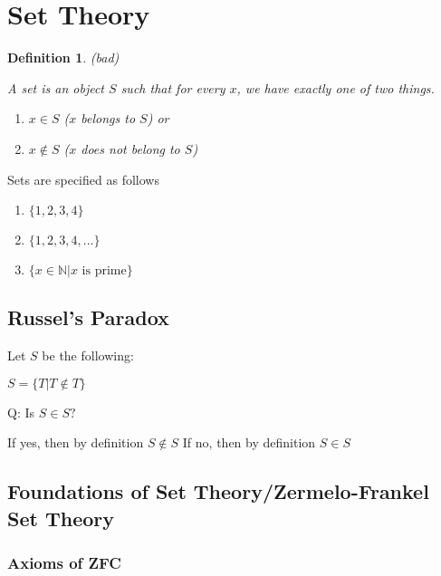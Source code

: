 \documentclass[twoside]{article}
\newcommand{\N}{\mathbb{N}}
\newtheorem{definition}[theorem]{Definition}
\begin{document}
    \section {Set Theory}

    \begin{definition}{(bad)}

        A set is an object $S$ such that for every $x$, we have exactly one of two things.

        \begin{enumerate}
            \item $x \in S$ ($x$ belongs to $S$) or 
            \item $x \not\in S$ ($x$ does not belong to $S$) 
        \end{enumerate}
    \end{definition}

    Sets are specified as follows
    \begin{enumerate}
        \item $\{1,2,3,4\}$
        \item $\{1,2,3,4,...\}$
        \item $\{x \in \N \vert x \text{ is prime}\}$
    \end{enumerate}

    \subsection{Russel's Paradox}
        Let $S$ be the following:

        $S = \{T \vert T \not\in T\}$

        Q: Is $S \in S?$

        If yes, then by definition $S \not\in S$
        If no, then by definition $S \in S$

    \subsection{Foundations of Set Theory/Zermelo-Frankel Set Theory}
    \subsubsection{Axioms of ZFC}
\end{document}
